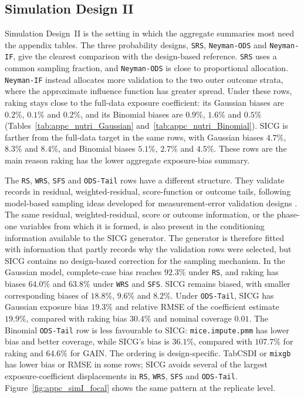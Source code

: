\subsection{Simulation Design II}
\label{sec:sicg_sim_nutri}

Simulation Design~II is the setting in which the aggregate summaries most need the appendix tables. The three probability designs, \texttt{SRS}, \texttt{Neyman-ODS} and \texttt{Neyman-IF}, give the clearest comparison with the design-based reference. \texttt{SRS} uses a common sampling fraction, and \texttt{Neyman-ODS} is close to proportional allocation. \texttt{Neyman-IF} instead allocates more validation to the two outer outcome strata, where the approximate influence function has greater spread. Under these rows, raking stays close to the full-data exposure coefficient: its Gaussian biases are $0.2\%$, $0.1\%$ and $0.2\%$, and its Binomial biases are $0.9\%$, $1.6\%$ and $0.5\%$ (Tables~\ref{tab:appc_nutri_Gaussian} and~\ref{tab:appc_nutri_Binomial}). SICG is farther from the full-data target in the same rows, with Gaussian biases $4.7\%$, $8.3\%$ and $8.4\%$, and Binomial biases $5.1\%$, $2.7\%$ and $4.5\%$. These rows are the main reason raking has the lower aggregate exposure-bias summary.

The \texttt{RS}, \texttt{WRS}, \texttt{SFS} and \texttt{ODS-Tail} rows have a different structure. They validate records in residual, weighted-residual, score-function or outcome tails, following model-based sampling ideas developed for measurement-error validation designs \citep{amorim2021two}. The same residual, weighted-residual, score or outcome information, or the phase-one variables from which it is formed, is also present in the conditioning information available to the SICG generator. The generator is therefore fitted with information that partly records why the validation rows were selected, but SICG contains no design-based correction for the sampling mechanism. In the Gaussian model, complete-case bias reaches $92.3\%$ under \texttt{RS}, and raking has biases $64.0\%$ and $63.8\%$ under \texttt{WRS} and \texttt{SFS}. SICG remains biased, with smaller corresponding biases of $18.8\%$, $9.6\%$ and $8.2\%$. Under \texttt{ODS-Tail}, SICG has Gaussian exposure bias $19.3\%$ and relative RMSE of the coefficient estimate $19.9\%$, compared with raking bias $30.4\%$ and nominal coverage $0.01$. The Binomial \texttt{ODS-Tail} row is less favourable to SICG: \texttt{mice.impute.pmm} has lower bias and better coverage, while SICG's bias is $36.1\%$, compared with $107.7\%$ for raking and $64.6\%$ for GAIN. The ordering is design-specific. TabCSDI or \texttt{mixgb} has lower bias or RMSE in some rows; SICG avoids several of the largest exposure-coefficient displacements in \texttt{RS}, \texttt{WRS}, \texttt{SFS} and \texttt{ODS-Tail}. Figure~\ref{fig:appc_simI_focal} shows the same pattern at the replicate level.

